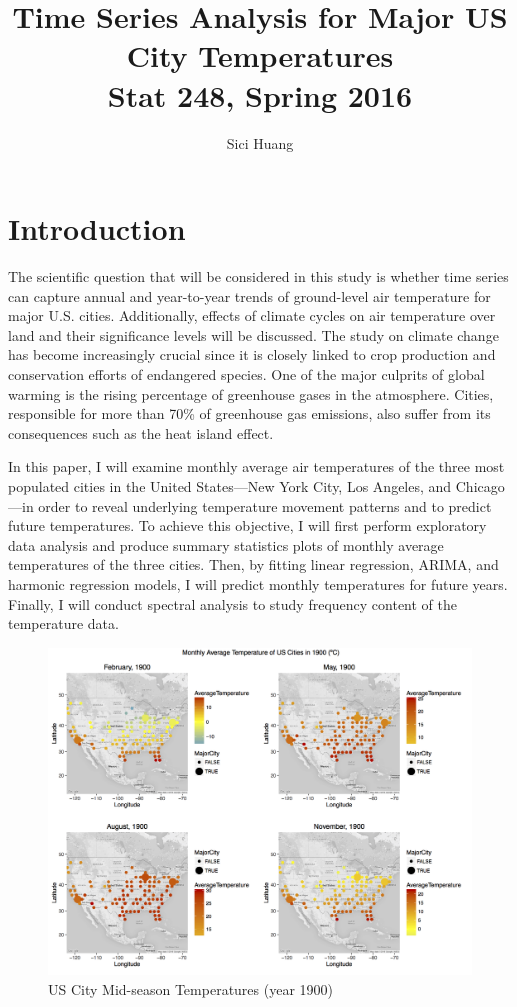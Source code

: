 \documentclass[12pt]{article}
\title{\vspace{-2cm} Time Series Analysis for Major US City Temperatures\\
Stat 248, Spring 2016}
\author{Sici Huang}
\begin{document}
\maketitle{\vspace{-1.5cm}}
\section{Introduction}
The scientific question that will be considered in this study is whether time series can capture annual and year-to-year trends of ground-level air temperature for major U.S. cities. Additionally, effects of climate cycles on air temperature over land and their significance levels will be discussed. The study on climate change has become increasingly crucial since it is closely linked to crop production and conservation efforts of endangered species. One of the major culprits of global warming is the rising percentage of greenhouse gases in the atmosphere. Cities, responsible for more than 70\% of greenhouse gas emissions\cite{suf}, also suffer from its consequences such as the heat island effect.

\vspace{0.5cm}
\noindent In this paper, I will examine monthly average air temperatures of the three most populated cities in the United States---New York City, Los Angeles, and Chicago---in order to reveal underlying temperature movement patterns and to predict future temperatures. To achieve this objective, I will first perform exploratory data analysis and produce summary statistics plots of monthly average temperatures of the three cities. Then, by fitting linear regression, ARIMA, and harmonic regression models, I will predict monthly temperatures for future years. Finally, I will conduct spectral analysis to study frequency content of the temperature data. 




\begin{figure}[H]
    \centering
    \includegraphics[width=\textwidth]{Figures/1900.png}
    \caption{US City Mid-season Temperatures (year 1900)}
    \label{fig:1900}
\end{figure}
\end{document}
